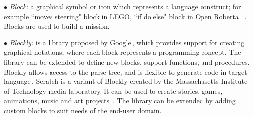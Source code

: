 $\bullet$ \emph{Block:} a graphical symbol or icon  which represents  a language construct; for example ``moves steering" block in LEGO, ``if do else" block in Open Roberta ~\cite{OpenRoberta}. Blocks are used to build a mission. %

$\bullet$ \emph{Blockly:} is a library proposed by Google\,\cite{blockly}, which provides support for creating graphical notations, where each block represents a programming concept. %
The library can be extended to define new blocks, support functions, and procedures. Blockly allows access to the parse tree, and is flexible to generate code in target language\,\cite{Passault2016}. Scratch is a variant of Blockly created by the Massachusetts Institute of Technology media laboratory. It can be used to create stories, games, animations, music and art projects~\cite{Kaucic2015}. The library can be extended by adding custom blocks to suit needs of the end-user domain. %

